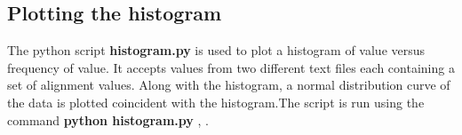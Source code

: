 \documentclass{article}
\begin{document}
\subsection{Plotting the histogram}

The python script \textbf{histogram.py} is used to plot a histogram of value versus frequency of value. It accepts values from two different text files each containing a set of alignment values. Along with the histogram, a normal distribution curve of the data is plotted coincident with the histogram.The script is run using the command \textbf{python histogram.py }, .
\newpage
\end{document}
